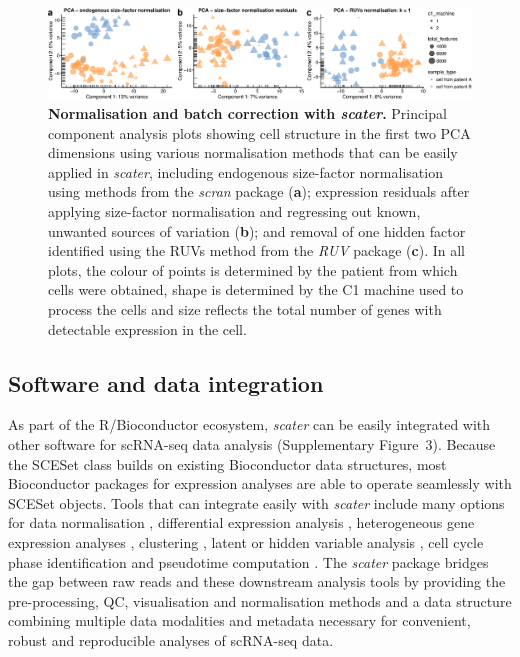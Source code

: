 \documentclass[10pt,letterpaper]{article}
\begin{document}
\begin{figure}[tpb]%
\begin{adjustwidth}{-2in}{0in}
\begin{flushright}
\includegraphics[width=1.3\textwidth]{figure5}
\end{flushright}
\justify
\color{Gray}
\caption{\small \textbf{Normalisation and batch correction with
\emph{scater}.} Principal component analysis plots showing cell
structure in the first two PCA dimensions using various normalisation
methods that can be easily applied in \emph{scater}, including
endogenous size-factor normalisation using methods from the \emph{scran}
package (\textbf{a}); expression residuals after applying size-factor
normalisation and regressing out known, unwanted sources of variation
(\textbf{b}); and removal of one hidden factor identified using
the RUVs method from the \emph{RUV} package (\textbf{c}). In all plots,
the colour of points is determined by the patient from which cells were
obtained, shape is determined by the C1 machine used to process the
cells and size reflects the total number of genes with detectable
expression in the cell.}\label{fig:05}
\end{adjustwidth}
\end{figure}


\subsection*{Software and data integration}\label{software-and-data-integration}

As part of the R/Bioconductor ecosystem, \emph{scater} can be easily
integrated with other software for scRNA-seq data analysis (Supplementary Figure~3). Because the
SCESet class builds on existing Bioconductor data structures, most
Bioconductor packages for expression analyses are able to operate
seamlessly with SCESet objects. Tools that can integrate easily with
\emph{scater} include many options for data normalisation
\citep{Lun2016-sk,Vallejos2015-ww,Ding2015-jv}, differential expression analysis
\citep{Vallejos2016-qy,Trapnell2014-gj,Finak2015-rd,Vu2016-sk,Kharchenko2014-rx,Korthauer2015-wg,Andrews2016-at}, heterogeneous gene expression analyses
\citep{Vallejos2015-ww}, clustering
\citep{Kiselev2016-fu,Guo2015-wx,Fan2016-wh,Grun2015-fy}, latent or hidden
variable analysis
\citep{Leek2014-nu,Risso2014-np,Stegle2012-is,Chikina2015-lq},
cell cycle phase identification \citep{Scialdone2015-gj} and pseudotime
computation \citep{Trapnell2014-gj,Angerer2015-sw,Julia2015-jt,Campbell2016-es,Haghverdi2016-is}. The \emph{scater} package bridges
the gap between raw reads and these downstream analysis tools by providing the
pre-processing, QC, visualisation and normalisation methods and a data
structure combining multiple data modalities and metadata necessary for
convenient, robust and reproducible analyses of scRNA-seq data.
\end{document}
